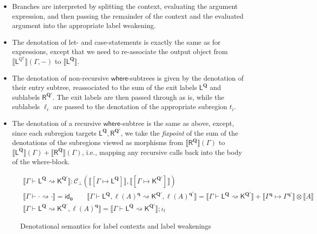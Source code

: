 \documentclass[acmsmall,screen,review]{acmart}
\newcommand{\mc}[1]{\ensuremath{\mathcal{#1}}}
\newcommand{\mb}[1]{\ensuremath{\mathbf{#1}}}
\newcommand{\ms}[1]{\ensuremath{\mathsf{#1}}}
\newcommand{\cwk}[2]{#1 \mapsto #2}
\newcommand{\lwk}[3]{#1 \vdash #2 \rightsquigarrow #3}
\newcommand{\lhyp}[2]{#1(#2)}
\newcommand{\ltoty}[2]{[#1 \mapsto #2]}
\newcommand{\dnt}[1]{\llbracket{#1}\rrbracket}
\newcommand{\zeroqv}[1]{#1^\uparrow}
\begin{document}
\begin{itemize}
  \item Branches are interpreted by splitting the context, evaluating the argument expression,
  and then passing the remainder of the context and the evaluated argument into the appropriate
  label weakening.
  \item The denotation of let- and case-statements is exactly the same as for expressions,
  except that we need to re-associate the output object from 
  $\dnt{\ms{L}^{\zeroqv{Q}}}(\Gamma, -)$ to $\dnt{\ms{L}^{\mb{Q}}}$.
  \item The denotation of non-recursive \ms{where}-subtrees is given by the denotation of their
  entry subtree, reassociated to the sum of the exit labels $\ms{L}^{\mb{Q}}$ and sublabels 
  $\ms{R}^{\mb{Q}'}$. The exit labels are then passed through as is, while the sublabels $\ell_i$ 
  are passed to the denotation of the appropriate subregion $t_i$.
  \item The denotation of a recursive \ms{where}-subtree is the same as above, except, since each
  subregion targets $\ms{L}^{\mb{Q}}, \ms{R}^{\mb{Q}'}$, we take the \emph{fixpoint} of the sum
  of the denotations of the subregions viewed as morphisms from $\dnt{\ms{R}^{\mb{Q}}}(\Gamma)$
  to $\dnt{\ms{L}^{\mb{Q}}}(\Gamma) + \dnt{\ms{R}^{\mb{Q}}}(\Gamma)$, i.e., mapping any recursive
  calls back into the body of the where-block.
\end{itemize}

\begin{figure}
  \begin{adjustbox}{minipage=1.1\textwidth,scale=0.9}
  \begin{gather*}
    \boxed{\dnt{\lwk{\Gamma}{\ms{L}^{\mb{Q}}}{\ms{K}^{\mb{Q}'}}} 
      : \mc{C}_\bot(\dnt{\ltoty{\Gamma}{\ms{L}^{\mb{Q}}}}, 
                    \dnt{\ltoty{\Gamma}{\ms{K}^{\mb{Q}'}}})} \\
    \dnt{\lwk{\Gamma}{\cdot}{\cdot}} = \ms{id}_{\mb{0}} \qquad
    \dnt
      {\lwk{\Gamma}{\ms{L}^{\mb{Q}}, \lhyp{\ell}{A}^{\mb{q}}}
      {\ms{K}^{\mb{Q}'}, \lhyp{\ell}{A}^{\mb{q}'}}}
    = \dnt{\lwk{\Gamma}{\ms{L}^{\mb{Q}}}{\ms{K}^{\mb{Q}'}}} 
      + \dnt{\cwk{\Gamma^{\mb{q}}}{\Gamma^{\mb{q}'}}} \otimes \dnt{A} \\
    \dnt
      {\lwk{\Gamma}{\ms{L}^{\mb{Q}}}
      {\ms{K}^{\mb{Q}'}, \lhyp{\ell}{A}^{\mb{q}}}}
    = \dnt{\lwk{\Gamma}{\ms{L}^{\mb{Q}}}{\ms{K}^{\mb{Q}'}}} ; \iota_l
  \end{gather*}
  \end{adjustbox}
  \caption{Denotational semantics for label contexts and label weakenings}
  \Description{}
  \label{fig:lwk-densem}
\end{figure}
\end{document}
